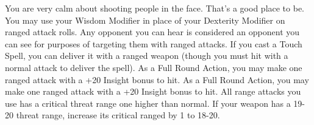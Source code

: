 \combatfeat
{You are very calm about shooting people in the face. That's a good place to be.}
{You may use your Wisdom Modifier in place of your Dexterity Modifier on ranged attack rolls.}
{Any opponent you can hear is considered an opponent you can see for purposes of targeting them with ranged attacks.}
{If you cast a Touch Spell, you can deliver it with a ranged weapon (though you must hit with a normal attack to deliver the spell).}
{As a Full Round Action, you may make one ranged attack with a +20 Insight bonus to hit.}
{As a Full Round Action, you may make one ranged attack with a +20 Insight bonus to hit. All range attacks you use has a critical threat range one higher than normal. If your weapon has a 19-20 threat range, increase its critical ranged by 1 to 18-20.}